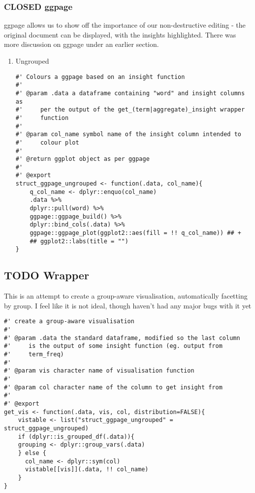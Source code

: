\documentclass[a4paper, 11pt]{article}
\begin{document}
\subsubsection{{\bfseries\sffamily CLOSED} ggpage}
\label{sec:orga8f6edf}
ggpage allows us to show off the importance of our non-destructive
editing - the original document can be displayed, with the insights
highlighted. There was more discussion on ggpage under an earlier section.
\begin{enumerate}
\item Ungrouped
\label{sec:orge404716}
\begin{verbatim}
#' Colours a ggpage based on an insight function
#'
#' @param .data a dataframe containing "word" and insight columns as
#'     per the output of the get_(term|aggregate)_insight wrapper
#'     function
#'
#' @param col_name symbol name of the insight column intended to
#'     colour plot
#'
#' @return ggplot object as per ggpage
#'
#' @export
struct_ggpage_ungrouped <- function(.data, col_name){
    q_col_name <- dplyr::enquo(col_name)
    .data %>%
	dplyr::pull(word) %>%
	ggpage::ggpage_build() %>%
	dplyr::bind_cols(.data) %>% 
	ggpage::ggpage_plot(ggplot2::aes(fill = !! q_col_name)) ## +
	## ggplot2::labs(title = "")
}
\end{verbatim}
\end{enumerate}
\subsection{{\bfseries\sffamily TODO} Wrapper}
\label{sec:org3877e32}
This is an attempt to create a group-aware visualisation,
automatically facetting by group. I feel like it is not ideal, though
haven't had any major bugs with it yet
\begin{verbatim}
#' create a group-aware visualisation
#'
#' @param .data the standard dataframe, modified so the last column
#'     is the output of some insight function (eg. output from
#'     term_freq)
#'
#' @param vis character name of visualisation function
#'
#' @param col character name of the column to get insight from
#'
#' @export
get_vis <- function(.data, vis, col, distribution=FALSE){
    vistable <- list("struct_ggpage_ungrouped" = struct_ggpage_ungrouped)
    if (dplyr::is_grouped_df(.data)){
	grouping <- dplyr::group_vars(.data)
    } else {
      col_name <- dplyr::sym(col)
      vistable[[vis]](.data, !! col_name)
    }
}
\end{verbatim}
\end{document}
